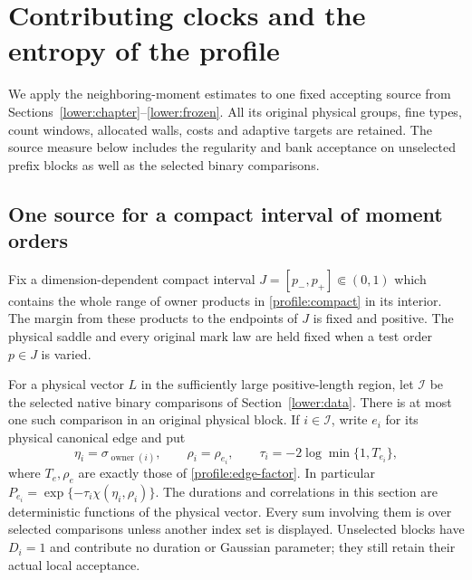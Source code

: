 \section{Contributing clocks and the entropy of the profile}
\label{fp:sec:arithmetic}

We apply the neighboring-moment estimates to one fixed accepting source
from Sections~\ref{lower:chapter}--\ref{lower:frozen}. All its original
physical groups, fine types, count windows, allocated walls, costs and
adaptive targets are retained. The source measure below includes the
regularity and bank acceptance on unselected prefix blocks as well as
the selected binary comparisons.

\subsection{One source for a compact interval of moment orders}

Fix a dimension-dependent compact interval
$J=[p_-,p_+]\Subset(0,1)$ which contains the whole range of owner
products in \eqref{profile:compact} in its interior. The margin from
these products to the endpoints of $J$ is fixed and positive. The
physical saddle and every original mark law are held fixed when a
test order $p\in J$ is varied.

For a physical vector $L$ in the sufficiently large positive-length
region, let $\mathcal I$ be the selected native binary comparisons
of Section~\ref{lower:data}. There is at most one such comparison
in an original physical block. If $i\in\mathcal I$, write $e_i$
for its physical canonical edge and put
\begin{equation}
 \eta_i=\sigma_{\operatorname{owner}(i)},\qquad
 \rho_i=\rho_{e_i},\qquad
 \tau_i=-2\log\min\{1,T_{e_i}\},
 \label{fp:eq:physical-duration}
\end{equation}
where $T_e,\rho_e$ are exactly those of
\eqref{profile:edge-factor}. In particular
$P_{e_i}=\exp\{-\tau_i\chi(\eta_i,\rho_i)\}$.
The durations and correlations in this section are deterministic
functions of the physical vector. Every sum involving them is over
selected comparisons unless another index set is displayed.
Unselected blocks have $D_i=1$ and contribute no duration or Gaussian
parameter; they still retain their actual local acceptance.

